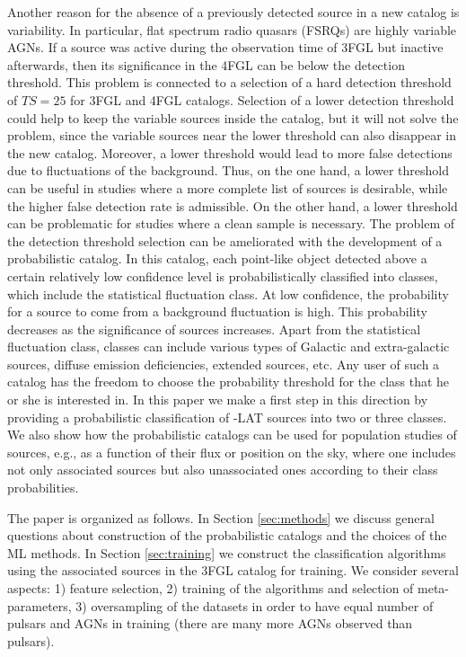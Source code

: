 Another reason for the absence of a previously detected source in a new catalog is variability.
In particular, flat spectrum radio quasars (FSRQs) are highly variable AGNs.
If a source was active during the observation time of 3FGL but inactive afterwards, 
then its significance in the 4FGL can be below the detection threshold.
This problem is connected to a selection of a hard detection threshold of $TS = 25$ for 3FGL and 4FGL catalogs.
Selection of a lower detection threshold could help to keep the variable sources inside the catalog, 
but it will not solve the problem, since the variable sources near the lower threshold can also disappear in the new catalog.
Moreover, a lower threshold would lead to more false detections due to fluctuations of the background.
Thus, on the one hand, a lower threshold can be useful in studies where a more complete list of sources is desirable,
while the higher false detection rate is admissible. On the other hand, a lower threshold can be problematic for studies where 
a clean sample is necessary. 
The problem of the detection threshold selection can be ameliorated with the development of a probabilistic catalog.
In this catalog, each point-like object detected above a certain relatively low confidence level
is probabilistically classified into classes, which include the statistical fluctuation class.
At low confidence, the probability for a source to come from a background fluctuation is high.
This probability decreases as the significance of sources increases.
Apart from the statistical fluctuation class, classes can include various types of Galactic and extra-galactic sources, diffuse emission deficiencies, extended sources, etc.
Any user of such a catalog has the freedom to choose the probability threshold for the class that he or she is interested in.
In this paper we make a first step in this direction by providing a probabilistic classification of \Fermi-LAT sources into two or three classes.
We also show how the probabilistic catalogs can be used for population studies of sources, e.g., as a function of their flux or position on the sky, where one includes not only associated sources but also unassociated ones according to their class probabilities.

The paper is organized as follows.
In Section \ref{sec:methods} we discuss general questions about construction of the probabilistic catalogs and the choices of the ML methods.
In Section \ref{sec:training} we construct the classification algorithms using the associated sources in the 3FGL catalog for training. We consider several aspects: 1) feature selection, 2) training of the algorithms and selection of meta-parameters,
3) oversampling of the datasets in order to have equal number of pulsars and AGNs in training (there are many more AGNs observed than pulsars).

